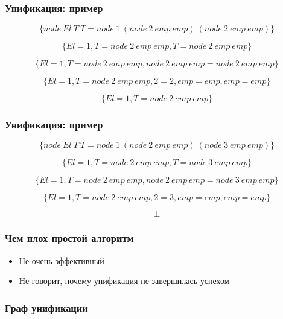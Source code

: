 \documentclass{beamer}
\begin{document}
\begin{frame}[fragile]
  \frametitle{Унификация: пример}
\[
  \{ node \ El \ T \ T = node \ 1 \ (node \ 2 \ emp \ emp) \ (node \ 2 \ emp \ emp) \}
\]

\[
  \{ El = 1, T = node \ 2 \ emp \ emp, T = node \ 2 \ emp \ emp \}
\]

\[
  \{ El = 1, T = node \ 2 \ emp \ emp, node \ 2 \ emp \ emp = node \ 2 \ emp \ emp \}
\]

\[
  \{ El = 1, T = node \ 2 \ emp \ emp, 2 = 2, emp = emp, emp = emp \}
\]

\[
  \{ El = 1, T = node \ 2 \ emp \ emp \}
\]
\end{frame}


\begin{frame}[fragile]
  \frametitle{Унификация: пример}
\[
  \{ node \ El \ T \ T = node \ 1 \ (node \ 2 \ emp \ emp) \ (node \ 3 \ emp \ emp) \}
\]

\[
  \{ El = 1, T = node \ 2 \ emp \ emp, T = node \ 3 \ emp \ emp \}
\]

\[
  \{ El = 1, T = node \ 2 \ emp \ emp, node \ 2 \ emp \ emp = node \ 3 \ emp \ emp \}
\]

\[
  \{ El = 1, T = node \ 2 \ emp \ emp, 2 = 3, emp = emp, emp = emp \}
\]

\[
  \bot
\]
\end{frame}


\begin{frame}[fragile]
  \frametitle{Чем плох простой алгоритм}
  \begin{itemize}
    \item Не очень эффективный
    \item Не говорит, почему унификация не завершилась успехом
  \end{itemize}
\end{frame}


\begin{frame}[fragile]
  \frametitle{Граф унификации}

\end{frame}
\end{document}
